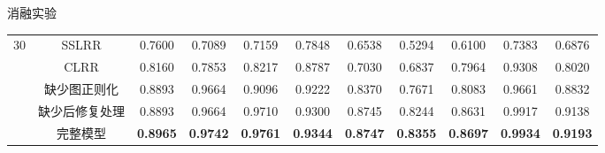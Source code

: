 \documentclass{beamer}
\begin{document}
\begin{frame}{消融实验}
\begin{table}[H]
\begin{tabular}{ccccccccccc}
			\hline
			\multirow{5}{*}{30} 
			& SSLRR & 0.7600 & 0.7089 & 0.7159 & 0.7848 & 0.6538 & 0.5294 & 0.6100 & 0.7383 & 0.6876 \\
			& CLRR & 0.8160 & 0.7853 & 0.8217 & 0.8787 & 0.7030 & 0.6837 & 0.7964 & 0.9308 & 0.8020 \\
			& 缺少图正则化 & 0.8893 & 0.9664 & 0.9096 & 0.9222 & 0.8370 & 0.7671 & 0.8083 & 0.9661 & 0.8832 \\
			& 缺少后修复处理 & 0.8893 & 0.9664 & 0.9710 & 0.9300 & 0.8745 & 0.8244 & 0.8631 & 0.9917 & 0.9138 \\
			& 完整模型 & \textbf{0.8965} & \textbf{0.9742} & \textbf{0.9761} & \textbf{0.9344} & \textbf{0.8747} & \textbf{0.8355} & \textbf{0.8697} & \textbf{0.9934} & \textbf{0.9193} \\ 
			\hline
		\end{tabular}
	\end{table}

\end{frame}
\end{document}
